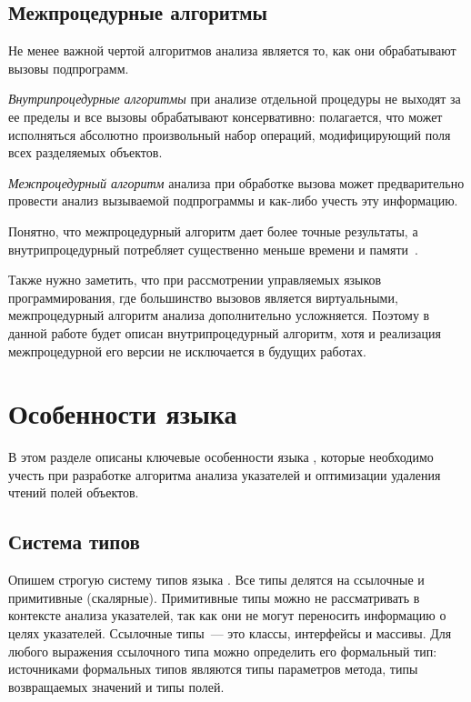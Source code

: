 \documentclass[14pt,titlepage,draft]{extarticle}
\newcommand{\java}{\eng{Java}\xspace}
\begin{document}
  \subsection{Межпроцедурные алгоритмы}

    Не менее важной чертой алгоритмов анализа является то, как они
    обрабатывают вызовы подпрограмм.

    \emph{Внутрипроцедурные алгоритмы} при анализе отдельной процедуры не
    выходят за ее пределы и все вызовы обрабатывают консервативно: полагается,
    что может исполняться абсолютно произвольный набор операций, модифицирующий
    поля всех разделяемых объектов.

    \emph{Межпроцедурный алгоритм} анализа при обработке вызова может
    предварительно провести анализ вызываемой подпрограммы и как-либо учесть
    эту информацию.

    Понятно, что межпроцедурный алгоритм дает более точные результаты,
    а внутрипроцедурный потребляет существенно меньше времени и
    памяти~\cite[с.~117]{andersen}.

    Также нужно заметить, что при рассмотрении управляемых языков
    программирования, где большинство вызовов является виртуальными,
    межпроцедурный алгоритм анализа дополнительно усложняется. Поэтому в
    данной работе будет описан внутрипроцедурный алгоритм, хотя и реализация
    межпроцедурной его версии не исключается в будущих работах.

  \section{Особенности языка \texorpdfstring{\java}{Java}}

    В этом разделе описаны ключевые особенности языка \java, которые необходимо
    учесть при разработке алгоритма анализа указателей и оптимизации удаления
    чтений полей объектов.

  \subsection{Система типов}
    \label{section:type_system}

    Опишем строгую систему типов языка \java.
    Все типы делятся на ссылочные и примитивные (скалярные).
    Примитивные типы можно не рассматривать в контексте анализа указателей,
    так как они не могут переносить информацию о целях указателей.
    Ссылочные типы~--- это классы, интерфейсы и массивы.
    Для любого выражения ссылочного типа можно определить его формальный тип:
    источниками формальных типов являются типы параметров метода, типы
    возвращаемых значений и типы полей.
\end{document}
